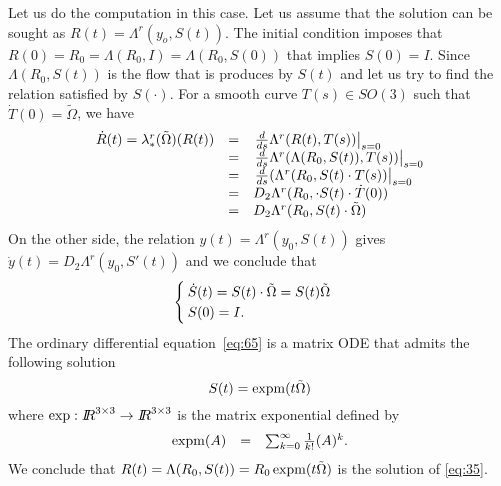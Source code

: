 Let us do the  computation in this case. Let us assume that the solution can be sought as $R(t) = \Lambda^r(y_o,S(t))$. The initial condition imposes that  $R(0) = R_0 = \Lambda(R_0,I) = \Lambda(R_0,S(0))$ that implies $S(0)=I$. Since $\Lambda(R_0,S(t))$ is the flow that is produces by $S(t)$ and let us try to find the relation satisfied by $S(\cdot)$. For a smooth curve $T(s) \in SO(3)$ such that $\dot T(0)= \tilde \Omega$, we have
\begin{equation}
  \label{eq:64}
  \begin{array}[lcl]{lcl}
    \dot R(t) = \lambda^r_*(\tilde \Omega)(R(t)) &=& \left. \frac{d}{ds}\Lambda^r(R(t),T(s)) \right|_{s=0} \\
                                &=& \left. \frac{d}{ds} \Lambda^r(\Lambda(R_0, S(t)),T(s)) \right|_{s=0} \\
                                &=& \left. \frac{d}{ds} (\Lambda^r(R_0, S(t)\glaw T(s)) \right|_{s=0} \\
                                &=& D_2 \Lambda^r(R_0, \glaw S(t) \glaw \dot T(0) ) \\
                                &=& D_2 \Lambda^r(R_0,  S(t)\glaw \tilde \Omega )
  \end{array}
\end{equation}
On the other side, the relation $y(t) = \Lambda^r(y_0,S(t))$ gives $\dot y(t) = D_2 \Lambda^r(y_0,S'(t))$ and we conclude that
\begin{equation}
  \label{eq:65}
  \begin{cases}
    \dot S(t) =  S(t)\cdot\tilde\Omega    = S(t) \tilde \Omega\\
    S(0) = I.
  \end{cases}
\end{equation}
The ordinary differential equation~\eqref{eq:65} is a matrix ODE that admits the following solution
\begin{equation}
  \label{eq:66}
  S(t) = \operatorname{expm}(t\tilde\Omega)
\end{equation}
where $\exp : \mbox{\rm $I\!\!R$}^{3\times 3} \rightarrow \mbox{\rm $I\!\!R$}^{3\times 3}$ is the matrix exponential defined by
\begin{equation}
  \label{eq:67}
  \begin{array}[lcl]{lcl}
    \expm(A) &=& \sum_{k=0}^{\infty} \frac {1}{k!} (A)^k.
  \end{array}
\end{equation}
We conclude that $R(t) =\Lambda(R_0,S(t)) = R_0\operatorname{expm}(t\tilde\Omega)$ is the solution of \eqref{eq:35}.

